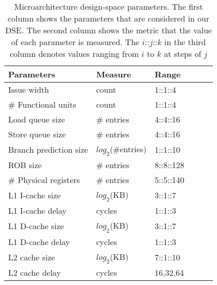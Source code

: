 
\begin{table}[p]
\large
\centering
\captionsetup{width=.9\columnwidth}
\caption{Microarchitecture design-space parameters. The first column shows the parameters that are considered in our DSE. The second column shows the metric that the value of each parameter is measured. The $i$::$j$::$k$ in the third column denotes values ranging from $i$ to $k$ at steps of $j$}
\renewcommand*{\arraystretch}{1.4}
\renewcommand*{\tabcolsep}{25pt}
\resizebox{.9\columnwidth}{!}
{
	\begin{tabular}{l l l l l l}
	\toprule[0.15em]
		\bigstrut\textbf{Parameters} & \bigstrut\textbf{Measure} & \bigstrut\textbf{Range}\\
	\midrule[0.05em]
		Issue width				&	count					&	1::1::4	\\
		\# Functional units		&	count					&	1::1::4 \\
		Load queue size			&	\# entries				&	4::4::16 \\
		Store queue size		&	\# entries				&	4::4::16 \\
        Branch prediction size  &   $log_{2}$(\#entries)    &   1::1::10\\
		ROB size				&	\# entries				&	8::8::128 \\
		\# Physical registers	&	\# entries				&	5::5::140 \\
		L1 I-cache size			&	$log_{2}$(KB)			&	3::1::7 \\
		L1 I-cache delay		&	cycles					&	1::1::3 \\
		L1 D-cache size			&	$log_{2}$(KB)			&	3::1::7 \\
		L1 D-cache delay		&	cycles					&	1::1::3\\
		L2 cache size			&	$log_{2}$(KB)			&	7::1::10 \\
		L2 cache delay			&	cycles					&	16,32,64 \\
	\bottomrule[0.15em]
	\end{tabular}
}
\label{tab:dse:para}
\end{table}
